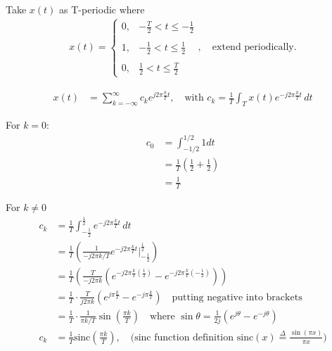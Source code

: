 \begin{example}
    Take $x(t)$ as T-periodic where 
    \begin{align*}
        x(t) = 
        \begin{cases}
            0, & -\frac{T}{2} < t \leq -\frac{1}{2} \\
            \\
            1, & -\frac{1}{2} < t \leq \frac{1}{2} \\
            \\
            0, & \frac{1}{2} < t \leq \frac{T}{2}
        \end{cases}
        , \quad \text{extend periodically}.
    \end{align*}
    
    \begin{align*}
        x(t) &= \sum_{k=-\infty}^{\infty} c_k e^{j2\pi \frac{k}{T} t}, \quad \text{with } c_k = \frac{1}{T} \int_{T} x(t) e^{-j2\pi \frac{k}{T} t} \, dt
    \end{align*}

    For $k=0$:
    \begin{align*}
        c_0 &= \int_{-1/2}^{1/2} 1 dt \\ 
        &= \frac{1}{T} \left(\frac{1}{2} + \frac{1}{2}\right) \\
        &= \frac{1}{T}
    \end{align*}
    
    For $k\neq 0$
    \begin{align*}
        c_k &= \frac{1}{T} \int_{-\frac{1}{2}}^{\frac{1}{2}} e^{-j2\pi \frac{k}{T} t} \, dt \\
        &= \frac{1}{T} \left( \frac{1}{-j2\pi k/T} e^{-j2\pi \frac{k}{T} t} \Big|_{-\frac{1}{2}}^{\frac{1}{2}} \right) \\
        &= \frac{1}{T} \left( \frac{T}{-j2\pi k} \left( e^{-j2\pi \frac{k}{T} \left(\frac{1}{2}\right)} - e^{-j2\pi \frac{k}{T} \left(-\frac{1}{2}\right)} \right) \right) \\
        &= \frac{1}{T} \cdot \frac{T}{j 2\pi k} \left(e^{j \pi \frac{k}{T}} - e^{-j \pi \frac{k}{T}} \right) \quad \text{putting negative into brackets}\\
        &= \frac{1}{T} \cdot \frac{1}{\pi k / T} \sin \left(\frac{\pi k}{T}\right) \quad \text{where } \sin\theta = \frac{1}{2j} \left(e^{j\theta} - e^{-j\theta}\right)\\
        c_k &= \frac{1}{T} \text{sinc}\left(\frac{\pi k}{T}\right), \quad \text{(sinc function definition $\text{sinc} (x) \overset{\Delta}{=} \frac{\sin (\pi x)}{\pi x}$)}
    \end{align*}
    \vspace{1em}
    

\end{example}
